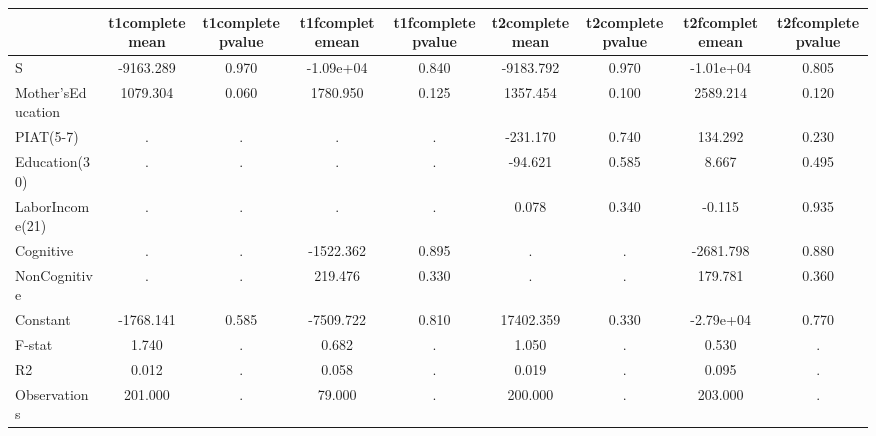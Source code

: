 \begin{table}[htbp]
\begin{tabular}{lcccccccc} \hline \hline
 & t1completemean  & t1completepvalue  & t1fcompletemean  & t1fcompletepvalue  & t2completemean  & t2completepvalue  & t2fcompletemean  & t2fcompletepvalue  \\  \hline 
S & -9163.289 &     0.970 & -1.09e+04 &     0.840 & -9183.792 &     0.970 & -1.01e+04 &     0.805 \\  
Mother'sEducation &  1079.304 &     0.060 &  1780.950 &     0.125 &  1357.454 &     0.100 &  2589.214 &     0.120 \\  
PIAT(5-7) &         . &         . &         . &         . &  -231.170 &     0.740 &   134.292 &     0.230 \\  
Education(30) &         . &         . &         . &         . &   -94.621 &     0.585 &     8.667 &     0.495 \\  
LaborIncome(21) &         . &         . &         . &         . &     0.078 &     0.340 &    -0.115 &     0.935 \\  
Cognitive &         . &         . & -1522.362 &     0.895 &         . &         . & -2681.798 &     0.880 \\  
NonCognitive &         . &         . &   219.476 &     0.330 &         . &         . &   179.781 &     0.360 \\  
Constant & -1768.141 &     0.585 & -7509.722 &     0.810 & 17402.359 &     0.330 & -2.79e+04 &     0.770 \\  
F-stat &     1.740 &         . &     0.682 &         . &     1.050 &         . &     0.530 &         . \\  
R2 &     0.012 &         . &     0.058 &         . &     0.019 &         . &     0.095 &         . \\  
Observations &   201.000 &         . &    79.000 &         . &   200.000 &         . &   203.000 &         . \\  
\hline \hline \end{tabular}
\end{table}

